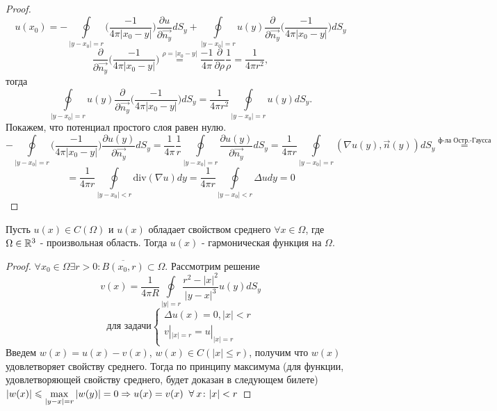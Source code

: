 \begin{proof}
$$u(x_0)= -\oint\limits_{|y-x_0|=r} \bigg( \frac{-1}{4\pi |x_0-y|} \bigg) \frac{\partial u}{\partial \vec{n_y}} dS_y + \oint\limits_{|y-x_0|=r} u(y) \frac{\partial}{\partial \vec{n_y}} \bigg(\frac{-1}{4\pi |x_0-y|}\bigg) dS_y $$
$$\frac{\partial}{\partial \vec{n_y}} \bigg(\frac{-1}{4\pi |x_0-y|}\bigg)\stackrel{\rho = |x_0 - y|}{=} \frac{-1}{4\pi}\frac{\partial}{\partial \rho}\frac{1}{\rho} = \frac{1}{4 \pi r^2},$$ тогда $$\oint\limits_{|y-x_0|=r} u(y) \frac{\partial}{\partial \vec{n_y}} \bigg(\frac{-1}{4\pi |x_0-y|}\bigg) dS_y = \frac{1}{4 \pi r^2} \oint\limits_{|y-x_0|=r} u(y) dS_y.$$
Покажем, что потенциал простого слоя равен нулю.
\[ -\oint\limits_{|y-x_0|=r} \bigg( \frac{-1}{4\pi |x_0-y|} \bigg) \frac{\partial u(y)}{\partial \vec{n_y}} dS_y = \frac{1}{4\pi} \frac{1}{r} \oint\limits_{|y-x_0|=r}  \frac{\partial u(y)}{\partial \vec{n_y}} dS_y = \frac{1}{4\pi r} \oint\limits_{|y-x_0|=r} (\nabla u(y), \vec{n}(y)) dS_y \stackrel{\text{ф-ла Остр.-Гаусса}}{=}
\]
\[
 = \frac{1}{4\pi r} \oint\limits_{|y-x_0|<r} \mathrm{div}(\nabla u) dy = \frac{1}{4\pi r} \oint\limits_{|y-x_0|<r} \Delta u dy  = 0
 \]
\end{proof}
\begin{theorem}
Пусть $u(x) \in C(\Omega)$ и $u(x)$ обладает свойством среднего $\forall x \in \Omega$, где $\Omega \in \mathbb{R}^3$ - произвольная область. Тогда $u(x)$ - гармоническая функция на $\Omega$. 
\end{theorem}
\begin{proof}
$\forall x_0\in\Omega\exists r > 0: \overline{B(x_0, r)}\subset\Omega.$ 
Рассмотрим решение $$v(x) = \frac{1}{4\pi R}\oint\limits_{|y|=r}\frac{r^2-|x|^2}{|y-x|^3}u(y)dS_y $$ 
$$\text{для задачи} \begin{cases}
\Delta u(x) = 0, |x| < r \\
v|_{|x| = r} = u|_{|x| = r}
\end{cases} $$
Введем $w(x) = u(x) - v(x)$, $w(x) \in C(|x| \leq r)$, получим что $w(x)$ удовлетворяет свойству среднего. Тогда по принципу максимума (для функции, удовлетворяющей свойству среднего, будет доказан в следующем билете) $|w(x)| \leqslant \max\limits_{|y-x| = r}|w(y)| = 0  \Rightarrow u(x) = v(x) \;\;\forall\: x\colon |x| < r$
\end{proof}